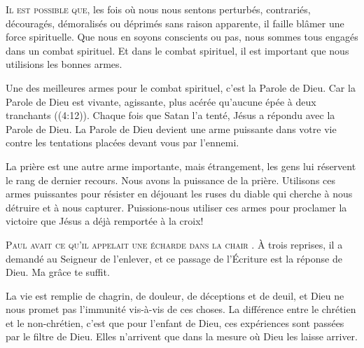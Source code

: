 \lettrine{I}{l est possible que,}
 les fois où nous nous sentons perturbés, contrariés, découragés,
 démoralisés ou déprimés sans raison apparente, il faille blâmer
 une force spirituelle.
 Que nous en soyons conscients ou pas, nous sommes tous engagés
 dans un combat spirituel. Et dans le combat spirituel,
 il est important que nous utilisions les bonnes armes.

Une des meilleures armes pour le combat spirituel, c'est la Parole de Dieu.
 \og Car la Parole de Dieu est vivante, agissante, plus acérée
 qu'aucune épée à deux tranchants \fg{} ((4:12)).
 Chaque fois que Satan l'a tenté, Jésus a répondu avec la Parole de Dieu.
 La Parole de Dieu devient une arme puissante dans votre vie
 contre les tentations placées devant vous par l'ennemi.


La prière est une autre arme importante, mais étrangement,
 les gens lui réservent le rang de dernier recours.
 Nous avons la puissance de la prière. Utilisons ces armes puissantes
 pour résister en déjouant les ruses du diable qui cherche à nous détruire
 et à nous capturer.
 Puissions-nous utiliser ces armes pour proclamer la victoire
 que Jésus a déjà remportée à la croix!

\dvrule






\lettrine{P}{aul avait ce qu'il appelait une \og écharde dans la chair \fg{}.}
 À trois reprises, il a demandé au Seigneur de l'enlever,
 et ce passage de l'Écriture est la réponse de Dieu.
 \og Ma grâce te suffit. \fg{}

La vie est remplie de chagrin, de douleur, de déceptions et de deuil,
 et Dieu ne nous promet pas l'immunité vis-à-vis de ces choses.
 La différence entre le chrétien et le non-chrétien,
 c'est que pour l'enfant de Dieu, ces expériences sont passées
 par le filtre de Dieu. Elles n'arrivent que dans la mesure
 où Dieu les laisse arriver.

